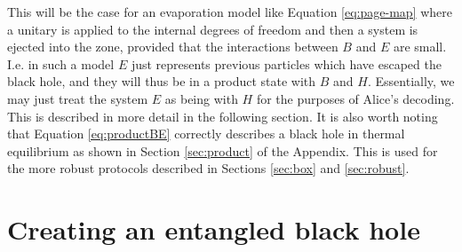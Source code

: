 \documentclass[12pt,a4paper]{article}
\begin{document}
This will be the case for an evaporation model like Equation \eqref{eq:page-map} where a unitary is applied to the internal degrees of freedom and then a system is ejected into the zone, provided that the interactions between $B$ and $E$ are small. I.e. in such a model $E$ just represents previous particles which have escaped the black hole, and they will thus be in a product state with $B$ and $H$. Essentially, we may just treat the system $E$ as being with $H$ for the purposes of Alice's decoding. This is described in more detail in the following section. It is also worth noting
that Equation \eqref{eq:productBE} correctly describes a black hole in thermal equilibrium as shown in Section \ref{sec:product} of the Appendix. This is used for the more robust protocols described in Sections \ref{sec:box} and \ref{sec:robust}.

\section{Creating an entangled black hole}
\label{sec:entangledbh}
\end{document}
